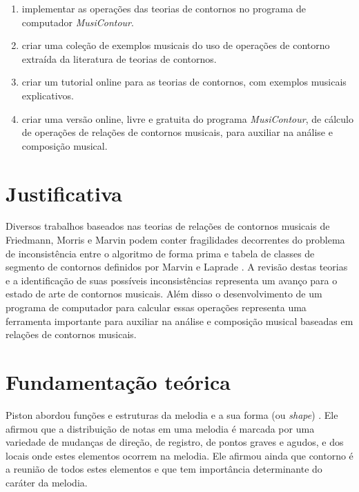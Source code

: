 \documentclass[12pt]{article}
\newcommand{\eng}[1]{\textit{#1}}
\begin{document}
\begin{enumerate}
\item implementar as operações das teorias de contornos no programa de
  computador \eng{MusiContour}.
\item criar uma coleção de exemplos musicais do uso de operações de
  contorno extraída da literatura de teorias de contornos.
\item criar um tutorial online para as teorias de contornos, com
  exemplos musicais explicativos.
\item criar uma versão online, livre e gratuita do programa
  \eng{MusiContour}, de cálculo de operações de relações de contornos
  musicais, para auxiliar na análise e composição musical.
\end{enumerate}

\section{Justificativa}
\label{sec:justificativa}

Diversos trabalhos baseados nas teorias de relações de contornos
musicais de Friedmann, Morris e Marvin podem conter fragilidades
decorrentes do problema de inconsistência entre o algoritmo de forma
prima e tabela de classes de segmento de contornos definidos por
Marvin e Laprade \cite{marvin.ea87:relating}. A revisão destas teorias
e a identificação de suas possíveis inconsistências representa um
avanço para o estado de arte de contornos musicais. Além disso o
desenvolvimento de um programa de computador para calcular essas
operações representa uma ferramenta importante para auxiliar na
análise e composição musical baseadas em relações de contornos
musicais.

\section{Fundamentação teórica}
\label{sec:fund-teor}




Piston abordou funções e estruturas da melodia e a sua forma (ou
\eng{shape}) \cite{piston59:harmony}. Ele afirmou que a distribuição
de notas em uma melodia é marcada por uma variedade de mudanças de
direção, de registro, de pontos graves e agudos, e dos locais onde
estes elementos ocorrem na melodia. Ele afirmou ainda que contorno é a
reunião de todos estes elementos e que tem importância determinante do
caráter da melodia.
\end{document}
